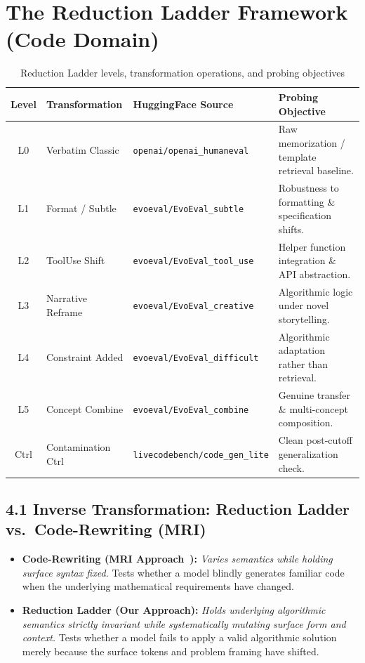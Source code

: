\documentclass[12pt, a4paper]{article}
\begin{document}
\section{The Reduction Ladder Framework (Code Domain)}

\begin{table}[ht!]
\centering
\caption{Reduction Ladder levels, transformation operations, and probing objectives}
\label{tab:ladder}
\renewcommand{\arraystretch}{1.35}
{\small
\begin{tabularx}{\textwidth}{c l X X}
\toprule
\textbf{Level} & \textbf{Transformation} & \textbf{HuggingFace Source} & \textbf{Probing Objective} \\
\midrule
L0 & Verbatim Classic & \texttt{openai/openai\_humaneval} & Raw memorization / template retrieval baseline. \\
L1 & Format / Subtle & \texttt{evoeval/EvoEval\_subtle} & Robustness to formatting \& specification shifts. \\
L2 & ToolUse Shift & \texttt{evoeval/EvoEval\_tool\_use} & Helper function integration \& API abstraction. \\
L3 & Narrative Reframe & \texttt{evoeval/EvoEval\_creative} & Algorithmic logic under novel storytelling. \\
L4 & Constraint Added & \texttt{evoeval/EvoEval\_difficult} & Algorithmic adaptation rather than retrieval. \\
L5 & Concept Combine & \texttt{evoeval/EvoEval\_combine} & Genuine transfer \& multi-concept composition. \\
\midrule
Ctrl & Contamination Ctrl & \texttt{livecodebench/code\_gen\_lite} & Clean post-cutoff generalization check. \\
\bottomrule
\end{tabularx}
}
\end{table}

\subsection{4.1 Inverse Transformation: Reduction Ladder vs.\ Code-Rewriting (MRI)}

\begin{researchbox}[title={Theoretical Contrast: Reduction Ladder vs.\ Code-Rewriting (MRI)}]
\begin{itemize}[leftmargin=1.5em]
  \item \textbf{Code-Rewriting (MRI Approach~\cite{memorize_or_generalize}):} \emph{Varies semantics while holding surface syntax fixed.} Tests whether a model blindly generates familiar code when the underlying mathematical requirements have changed.
  \item \textbf{Reduction Ladder (Our Approach):} \emph{Holds underlying algorithmic semantics strictly invariant while systematically mutating surface form and context.} Tests whether a model fails to apply a valid algorithmic solution merely because the surface tokens and problem framing have shifted.
\end{itemize}
\end{researchbox}
\end{document}
